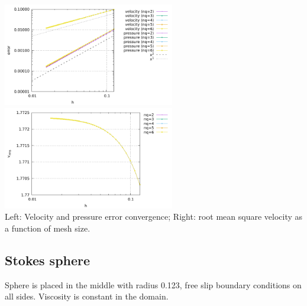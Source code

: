 \begin{center}
\includegraphics[width=7.5cm]{python_codes/fieldstone_80/results/db2d/errors}
\includegraphics[width=7.5cm]{python_codes/fieldstone_80/results/db2d/vrms}\\
{\captionfont Left: Velocity and pressure error convergence; Right: root mean square velocity
as a function of mesh size.}
\end{center}


\subsection*{Stokes sphere}

Sphere is placed in the middle with radius 0.123, free slip boundary conditions on all sides. 
Viscosity is constant in the domain. 

